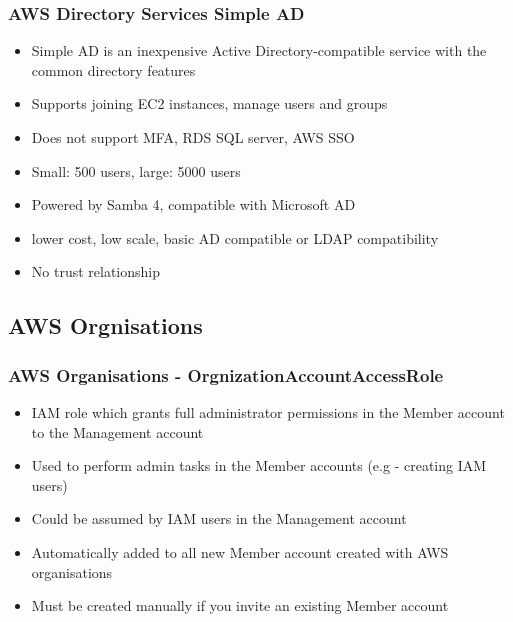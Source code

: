 \subsubsection{AWS Directory Services Simple AD}
\begin{itemize}
    \item Simple AD is an inexpensive Active Directory-compatible service with the common directory features
    \item Supports joining EC2 instances, manage users and groups
    \item Does not support MFA, RDS SQL server, AWS SSO
    \item Small: 500 users, large: 5000 users
    \item Powered by Samba 4, compatible with Microsoft AD
    \item lower cost, low scale, basic AD compatible or LDAP compatibility
    \item No trust relationship
\end{itemize}

\subsection{AWS Orgnisations}

\subsubsection{AWS Organisations - OrgnizationAccountAccessRole}
\begin{itemize}
    \item IAM role which grants full administrator permissions in the Member account to the Management account
    \item Used to perform admin tasks in the Member accounts (e.g - creating IAM users)
    \item Could be assumed by IAM users in the Management account
    \item Automatically added to all new Member account created with AWS organisations
    \item Must be created manually if you invite an existing Member account
\end{itemize}

